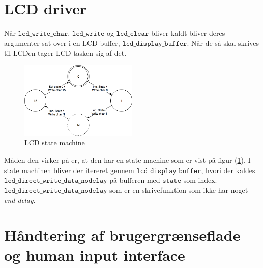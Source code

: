 \section{LCD driver}
Når $\mathtt{lcd\_write\_char}$, $\mathtt{lcd\_write}$ og $\mathtt{lcd\_clear}$ bliver kaldt bliver deres argumenter sat over i en LCD buffer, $\mathtt{lcd\_display\_buffer}$.
Når de så skal skrives til LCDen tager LCD tasken sig af det.
\begin{figure}[!ht]
	\centering
	\includegraphics[width=0.5\textwidth]{billeder/lcd_state_machine.png}
	\caption{LCD state machine}
	\label{fig:LCD_state_machine}
\end{figure}
\newline
Måden den virker på er, at den har en state machine som er vist på figur (\ref{fig:LCD_state_machine}).\newline
I state machinen bliver der itereret gennem $\mathtt{lcd\_display\_buffer}$, hvori der kaldes $\mathtt{lcd\_direct\_write\_data\_nodelay}$ på bufferen med $\mathtt{state}$ som index.\newline
$\mathtt{lcd\_direct\_write\_data\_nodelay}$ som er en skrivefunktion som ikke har noget \textit{end delay}.

\section{Håndtering af brugergrænseflade og human input interface}



